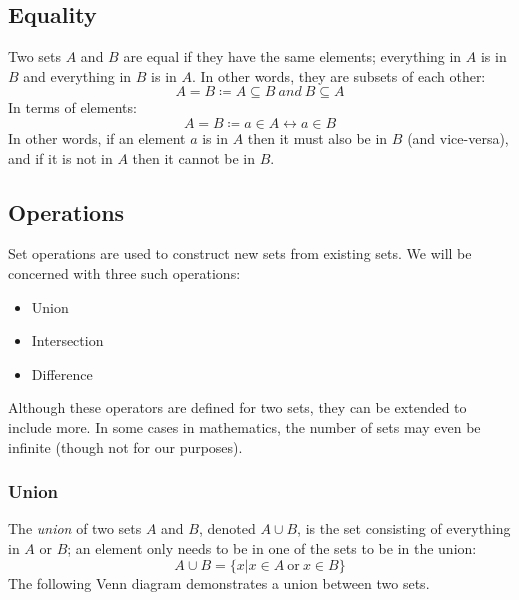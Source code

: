 \documentclass[letterpaper,12pt,fleqn]{article}
\begin{document}
\subsection*{Equality}

Two sets $A$ and $B$ are equal if they have the same elements; everything in
$A$ is in $B$ and everything in $B$ is in $A$. In other words, they are
subsets of each other:
\[A=B\coloneqq A\subseteq B\ and\ B\subseteq A\]
In terms of elements:
\[A=B\coloneqq a\in A\leftrightarrow a\in B\]
In other words, if an element $a$ is in $A$ then it must also be in $B$ (and
vice-versa), and if it is not in $A$ then it cannot be in $B$.

\subsection*{Operations}

Set operations are used to construct new sets from existing sets. We will be
concerned with three such operations:
\begin{itemize}
\item Union
\item Intersection
\item Difference
\end{itemize}
Although these operators are defined for two sets, they can be extended to
include more. In some cases in mathematics, the number of sets may even be
infinite (though not for our purposes).

\subsubsection*{Union}

The \emph{union} of two sets $A$ and $B$, denoted $A\cup B$, is the set
consisting of everything in $A$ or $B$; an element only needs to be in one
of the sets to be in the union:
\[A\cup B=\{x|x\in A\ \mbox{or}\ x\in B\}\]
The following Venn diagram demonstrates a union between two sets.

\begin{center}
\end{center}
\end{document}
